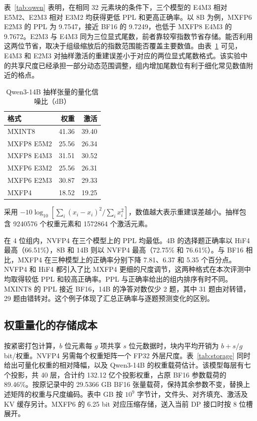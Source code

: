 \documentclass[10.5pt,compsoc,UTF8]{CjC}
\newcommand{\tabnote}[1]{\par\smallskip\begin{minipage}{\linewidth}\zihao{5-}#1\end{minipage}}
\begin{document}
表~\ref{tab:qwen} 表明，在相同 32 元素块的条件下，三个模型的 E4M3 相对 E5M2、E2M3 相对 E3M2 均获得更低 PPL 和更高正确率。以 8B 为例，MXFP6 E2M3 的 PPL 为 9.7547，接近 BF16 的 9.7249，也低于 MXFP8 E4M3 的 9.7672。E2M3 与 E4M3 同为三位显式尾数，前者靠较窄指数节省存储。能否利用这两位节省，取决于组级缩放后的指数范围能否覆盖主要数值。由表~\ref{tab:qs} 可见，E4M3 和 E2M3 对抽样激活的重建误差小于对应的两位显式尾数格式。该实验中的共享尺度已经承担一部分动态范围调整，组内增加尾数位有利于细化常见数值附近的格点。

\begin{table}[htbp]
\centering
\caption{Qwen3-14B 抽样张量的量化信噪比（dB）}
\label{tab:qs}
\begin{tabular}{@{}lrr@{}}
\toprule
格式 & 权重 & 激活 \\
\midrule
MXINT8       & 41.36 & 39.40 \\
MXFP8 E5M2   & 25.56 & 26.34 \\
MXFP8 E4M3   & 31.51 & 30.52 \\
MXFP6 E3M2   & 25.56 & 26.31 \\
MXFP6 E2M3   & 30.87 & 29.33 \\
MXFP4        & 18.52 & 19.25 \\
\bottomrule
\end{tabular}
\tabnote{采用 $-10\log_{10}[\sum_i(\hat{x}_i-x_i)^2/\sum_i x_i^2]$，数值越大表示重建误差越小。抽样包含 9240576 个权重元素和 1572864 个激活元素。}
\end{table}

在 4 位组内，NVFP4 在三个模型上的 PPL 均最低。4B 的选择题正确率以 HiF4 最高（66.51\%），8B 和 14B 则以 NVFP4 最高（72.75\% 和 76.61\%）。与 BF16 相比，MXFP4 在三种模型上的正确率分别下降 7.81、6.37 和 5.35 个百分点。NVFP4 和 HiF4 都引入了比 MXFP4 更细的尺度调节，这两种格式在本次评测中均取得较低 PPL 和较高正确率。PPL 与正确率给出的组内排序有时不同。MXINT8 的 PPL 接近 BF16，14B 的净答对数仅少 2 题，其中 31 题由对转错，29 题由错转对。这个例子体现了汇总正确率与逐题预测变化的区别。

\subsection{权重量化的存储成本}

按紧密打包计算，$b$ 位元素每 $g$ 项共享 $s$ 位元数据时，块内平均开销为 $b+s/g$ bit/权重。NVFP4 另需每个权重矩阵一个 FP32 外层尺度。表~\ref{tab:storage} 同时给出可量化权重的相对降幅，以及 Qwen3-14B 的权重载荷估计。该模型每层有七个投影，共 40 层，合计约 132.12 亿个投影权重，占原 BF16 参数载荷的 89.46\%。按原记录中的 29.5366 GB BF16 张量载荷，保持其余参数不变，替换上述矩阵的权重与尺度编码。表中 GB 按 $10^9$ 字节计，文件头、对齐填充、激活及 KV 缓存另计。MXFP6 的 6.25 bit 对应压缩存储，送入当前 DP 接口时按 8 位槽展开。
\end{document}
